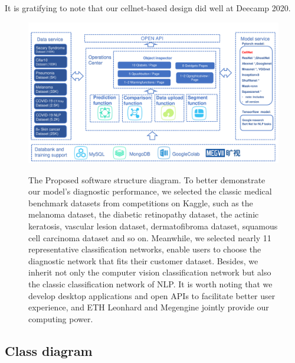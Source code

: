{It is gratifying to note that our cellnet-based design did well at  Deecamp 2020.
\begin{figure}[t]
\begin{center}
\includegraphics[height=0.35\textheight]{thesis-template-master/images/2020DeeCamp_ppt_tcy (1).pdf}
\label{fig:cellnet}
\end{center}
\caption{ The Proposed software structure diagram.
To better demonstrate our model's diagnostic performance, we selected the classic medical benchmark datasets from competitions on Kaggle, such as the melanoma dataset, the diabetic retinopathy dataset, the actinic keratosis, vascular lesion dataset, dermatofibroma dataset, squamous cell carcinoma dataset and so on. Meanwhile, we selected nearly 11  representative classification networks, enable users to choose the diagnostic network that fits their customer dataset. Besides, we inherit not only the computer vision classification network but also the classic classification network of NLP. It is worth noting that we develop desktop applications and open APIs to facilitate better user experience, and ETH Leonhard and Megengine jointly provide our computing power.}
\end{figure}

\subsection{Class diagram} %
\label{sub:amet}

}
